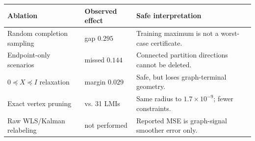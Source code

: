\begin{tabularx}{\columnwidth}{@{}
  >{\raggedright\arraybackslash}p{}
  >{\raggedright\arraybackslash}p{}
  >{\raggedright\arraybackslash}X@{}}
\toprule
Ablation & Observed effect & Safe interpretation \\
\midrule
Random completion sampling & gap $0.295$ & Training maximum is not a worst-case certificate. \\
Endpoint-only scenarios & missed $0.144$ & Connected partition directions cannot be deleted. \\
$0\preceq X\preceq I$ relaxation & margin $0.029$ & Safe, but loses graph-terminal geometry. \\
Exact vertex pruning & 21 vs. 31 LMIs & Same radius to $1.7\!\times\!10^{-9}$; fewer constraints. \\
Raw WLS/Kalman relabeling & not performed & Reported MSE is graph-signal smoother error only. \\
\bottomrule
\end{tabularx}
